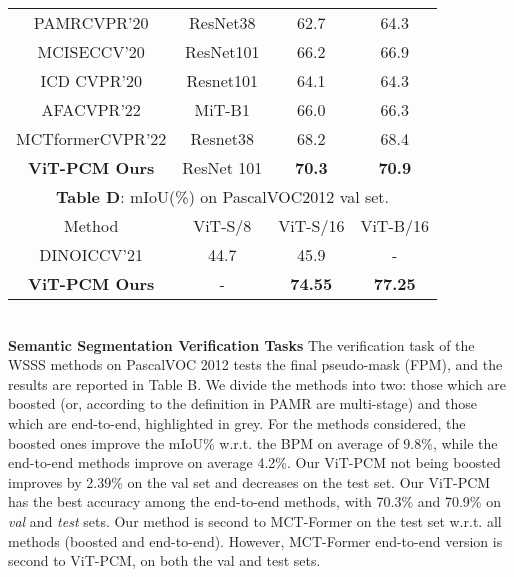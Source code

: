 \documentclass[runningheads]{styles/llncs}
\begin{document}
\begin{minipage}[t]{\textwidth}
\begin{minipage}[b]{0.495\textwidth}
{\begin{tabular}{|c | c | c | c | }
               \rowcolor{gray!10}
            PAMR\cite{araslanov2020single}\tiny{\textsc{CVPR'20} } &ResNet38 & 62.7  & 64.3\\
              \rowcolor{gray!18}
             MCIS\cite{sun2020mining}\tiny{\textsc{ECCV'20} }& ResNet101 &66.2 & 66.9\\
               \rowcolor{gray!10}
            ICD \cite{Fan_2020_CVPR}\tiny{\textsc{CVPR'20} } &  Resnet101 &  64.1 &   64.3 \\
              \rowcolor{gray!18}
            AFA\cite{ru2022learning}\tiny{\textsc{CVPR'22} } & MiT-B1 &  66.0 & 66.3\\
              \rowcolor{gray!10}
             MCTformer\cite{xu2022multi}\tiny{\textsc{CVPR'22} } &  Resnet38 &  68.2 & 68.4 \\  
               \rowcolor{gray!18}
             {\bf ViT-PCM Ours} & ResNet 101 &  {\bf 70.3} &  {\bf 70.9} \\
         \hline
\multicolumn{4}{c}{{\bf Table D}: mIoU(\%) on PascalVOC2012 val set.}\\
         \hline
       \rowcolor[gray]{.85}
         Method &  ViT-S/8 & ViT-S/16 & ViT-B/16\\ \hline\hline
         DINO\cite{caron2021emerging}\tiny{\textsc{ICCV'21} } & 44.7 & 45.9 & -\\
{\bf ViT-PCM Ours} & - & {\bf 74.55} &  {\bf 77.25}\\
         \hline
         


          
         
        \end{tabular}
        }\end{minipage}
\end{minipage} \\
\noindent
{\bf Semantic Segmentation Verification Tasks} The verification task of the WSSS methods on PascalVOC 2012 tests the final pseudo-mask (FPM), and the results are reported in Table {\color{red}B}. We divide the methods into two:   those which are boosted (or, according to the definition in PAMR \cite{araslanov2020single} are multi-stage) and those which are end-to-end, highlighted in grey. For the methods considered, the boosted ones improve the mIoU\% w.r.t. the BPM  on average of 9.8\%, while the end-to-end methods improve on average 4.2\%. Our ViT-PCM not being boosted improves by 2.39\% on the val set and decreases on the test set. Our ViT-PCM has the best accuracy among the end-to-end methods, with 70.3\% and 70.9\% on \textit{val} and \textit{test} sets.  Our method   is second to MCT-Former\cite{xu2022multi} on the test set w.r.t. all methods (boosted and end-to-end). However, MCT-Former end-to-end version is second to ViT-PCM, on both the val and test sets.
\end{document}
